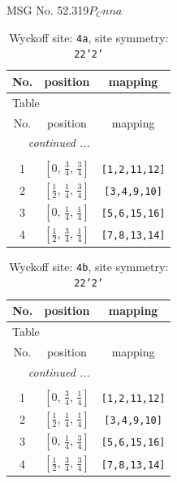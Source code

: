 \documentclass[fleqn,8pt]{jsarticle}
\begin{document}
\setcounter{MaxMatrixCols}{32}

\renewcommand{\tablename}{Table~}
\renewcommand{\figurename}{Figure~}
\begin{center}
\LARGE
MSG No. 52.319\quad$P_{C}nna$
\end{center}
\renewcommand{\arraystretch}{1.2}
\begin{longtable}{ccc}
\caption{Wyckoff site: {\tt 4a}, site symmetry: {\tt 22'2'}}
 \\
 \hline \hline
No. & position & mapping \\ \hline \endfirsthead

\multicolumn{2}{l}{\tablename\ \thetable{}} \\
 \hline \hline
No. & position & mapping \\ \hline \endhead

 \hline \hline
\multicolumn{2}{r}{\footnotesize\it continued ...} \\ \endfoot

 \hline \hline
\multicolumn{2}{r}{} \\ \endlastfoot

1 & $\left[ 0,\, \frac{3}{4},\, \frac{3}{4} \right]$ & {\tt [1,2,11,12]} \\ \hline
2 & $\left[ \frac{1}{2},\, \frac{1}{4},\, \frac{3}{4} \right]$ & {\tt [3,4,9,10]} \\ \hline
3 & $\left[ 0,\, \frac{1}{4},\, \frac{1}{4} \right]$ & {\tt [5,6,15,16]} \\ \hline
4 & $\left[ \frac{1}{2},\, \frac{3}{4},\, \frac{1}{4} \right]$ & {\tt [7,8,13,14]} \\
\end{longtable}
\renewcommand{\arraystretch}{1.2}
\begin{longtable}{ccc}
\caption{Wyckoff site: {\tt 4b}, site symmetry: {\tt 22'2'}}
 \\
 \hline \hline
No. & position & mapping \\ \hline \endfirsthead

\multicolumn{2}{l}{\tablename\ \thetable{}} \\
 \hline \hline
No. & position & mapping \\ \hline \endhead

 \hline \hline
\multicolumn{2}{r}{\footnotesize\it continued ...} \\ \endfoot

 \hline \hline
\multicolumn{2}{r}{} \\ \endlastfoot

1 & $\left[ 0,\, \frac{3}{4},\, \frac{1}{4} \right]$ & {\tt [1,2,11,12]} \\ \hline
2 & $\left[ \frac{1}{2},\, \frac{1}{4},\, \frac{1}{4} \right]$ & {\tt [3,4,9,10]} \\ \hline
3 & $\left[ 0,\, \frac{1}{4},\, \frac{3}{4} \right]$ & {\tt [5,6,15,16]} \\ \hline
4 & $\left[ \frac{1}{2},\, \frac{3}{4},\, \frac{3}{4} \right]$ & {\tt [7,8,13,14]} \\
\end{longtable}
\end{document}
